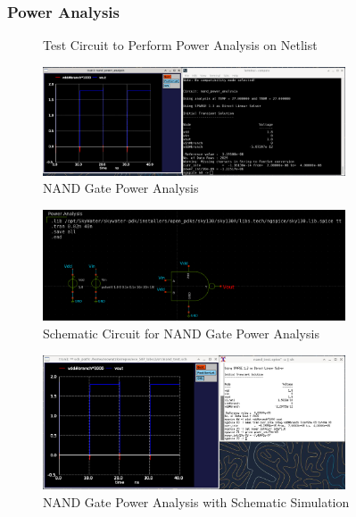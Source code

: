 \documentclass{article}
\begin{document}
	\subsubsection{Power Analysis}
	\begin{figure}[H]
		
		\caption{Test Circuit to Perform Power Analysis on Netlist}
		\label{fig::nand_power_analysis_test_circuit}
	\end{figure}
	
	\begin{figure}[H]
		\centerline{\includegraphics[width=0.8\textwidth]{nand_power_analysis.png}}
		\caption{NAND Gate Power Analysis}
		\label{fig::nand_power_analysis}
	\end{figure}
	
	\begin{figure}[H]
		\centerline{\includegraphics[width=0.8\textwidth]{nand_power_analysis_test_circuit.png}}
		\caption{Schematic Circuit for NAND Gate Power Analysis}
		\label{fig::nand_power_analysis_test_circuit}
	\end{figure}
	
	\begin{figure}[H]
		\centerline{\includegraphics[width=0.8\textwidth]{nand_power_analysis_schem.png}}
		\caption{NAND Gate Power Analysis with Schematic Simulation}
		\label{fig::nand_power_analysis_schem}
	\end{figure}
\end{document}
